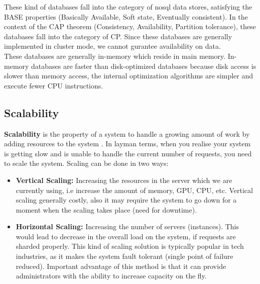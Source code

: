 \documentclass[11pt]{article}
\begin{document}
These kind of databases fall into the category of nosql data stores, satisfying the 
BASE properties (Basically Available, Soft state, Eventually consistent).
In the context of the CAP theorem (Consistency, Availability, Partition tolerance), these
databases fall into the category of CP. Since these databases are generally implemented
in cluster mode, we cannot gurantee availability on data.
\\

These databases are generally in-memory which reside in main memory. In-memory
databases are faster than disk-optimized databases because disk access is 
slower than memory access, the internal optimization algorithms 
are simpler and execute fewer CPU instructions.

\subsection*{Scalability}
\textbf{Scalability} is the property of a system to handle a growing amount of work
by adding resources to the system \cite{scaling}. In layman terms, when
you realise your system is getting slow and is unable to handle
the current number of requests, you need to scale the system. Scaling 
can be done in two ways:

\begin{itemize}
    \item \textbf{Vertical Scaling:} Increasing the resources in the server
            which we are currently using, i.e increase the amount of memory, GPU,
            CPU, etc. Vertical scaling generally costly, also it may
            require the system to go down for a moment when the scaling takes
            place (need for downtime).
    \item \textbf{Horizontal Scaling:} Increasing the number of servers (instances).
            This would lead to decrease in the overall load on the system, if requests
            are sharded properly. This kind of scaling solution is typically popular 
            in tech industries, as it makes the system fault tolerant (single point of
            failure reduced). Important advantage of this method is that it can provide
            administrators with the ability to increase capacity on the fly.
\end{itemize}
\end{document}
